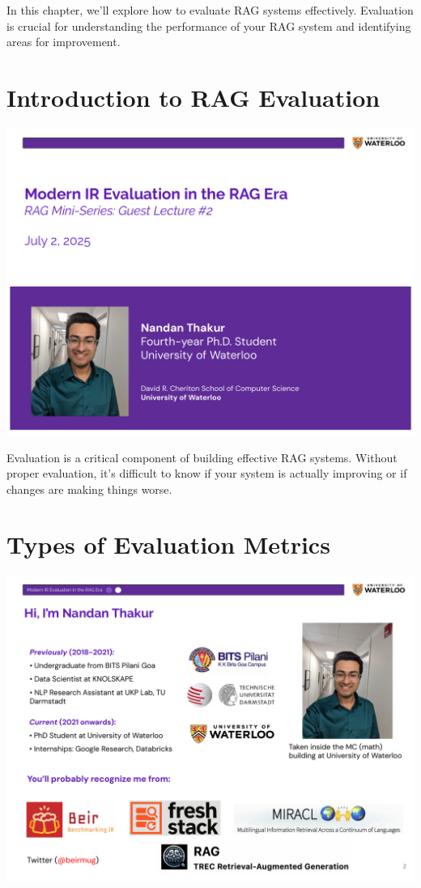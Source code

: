 \documentclass[
  letterpaper,
  oneside]{scrbook}
\begin{document}
In this chapter, we'll explore how to evaluate RAG systems effectively.
Evaluation is crucial for understanding the performance of your RAG
system and identifying areas for improvement.

\section{Introduction to RAG
Evaluation}\label{introduction-to-rag-evaluation}

\includegraphics{chapters/../p2-images/slide_1.png}

Evaluation is a critical component of building effective RAG systems.
Without proper evaluation, it's difficult to know if your system is
actually improving or if changes are making things worse.

\section{Types of Evaluation Metrics}\label{types-of-evaluation-metrics}

\includegraphics{chapters/../p2-images/slide_2.png}
\end{document}
